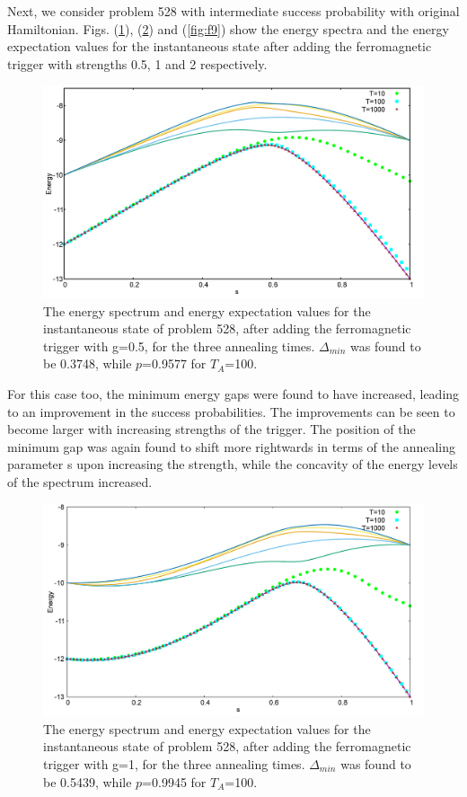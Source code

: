 \documentclass[../main.tex]{subfiles}
\begin{document}
Next, we consider problem 528 with intermediate success probability with original Hamiltonian. Figs. (\ref{fig:f7}), (\ref{fig:f8}) and (\ref{fig:f9}) show the energy spectra and the energy expectation values for the instantaneous state after adding the ferromagnetic trigger with strengths 0.5, 1 and 2 respectively.
\begin{figure}[H]
\centering 
\includegraphics[scale=0.24]{528_s12_F_g0.png}
\caption{The energy spectrum and energy expectation values for the instantaneous state of problem 528, after adding the ferromagnetic trigger with g=0.5, for the three annealing times. $\Delta_{min}$ was found to be 0.3748, while $p$=0.9577 for $T_A$=100.}
\label{fig:f7}
\end{figure}
For this case too, the minimum energy gaps were found to have increased, leading to an improvement in the success probabilities. The improvements can be seen to become larger with increasing strengths of the trigger. The position of the minimum gap was again found to shift more rightwards in terms of the annealing parameter s upon increasing the strength, while the concavity of the energy levels of the spectrum increased. \\
\begin{figure}[H]
\centering 
\includegraphics[scale=0.24]{528_s12_F_g1.png}
\caption{The energy spectrum and energy expectation values for the instantaneous state of problem 528, after adding the ferromagnetic trigger with g=1, for the three annealing times. $\Delta_{min}$ was found to be 0.5439, while $p$=0.9945 for $T_A$=100.}
\label{fig:f8}
\end{figure}
\end{document}
